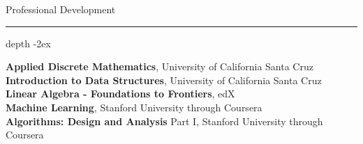 \documentclass[12pt]{article}
\newcommand\sectionline{\par\leavevmode\leaders\hrule height 2ex depth \dimexpr0.4pt-2ex\hfill\kern0pt\par}
\begin{document}
{\Large Professional Development}\sectionline
\qquad \quad \textbf{Applied Discrete Mathematics}, University of California Santa Cruz \\

\qquad \quad \textbf{Introduction to Data Structures}, University of California Santa Cruz \\

\qquad \quad \textbf{Linear Algebra - Foundations to Frontiers}, edX \\

\qquad \quad \textbf{Machine Learning}, Stanford University through Coursera  \\

\qquad \quad \textbf{Algorithms: Design and Analysis} Part I, Stanford University through Coursera \\
\end{document}
